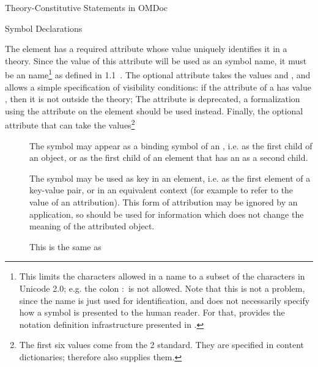 \begin{omgroup}[short=Mathematical Statements,id=statements]
\begin{omgroup}[id=constitutive-statements]{Theory-Constitutive Statements in OMDoc}
\begin{module}[id=constitutive-statements]
\begin{omgroup}[id=symbol-dec]{Symbol Declarations}
\begin{definition}[id=symbol.def]
  The {} element has a required attribute {} whose
  value uniquely identifies it in a theory.  Since the value of this attribute will be
  used as an {\openmath} symbol name, it must be an {\xml} name\footnote{This limits the
    characters allowed in a name to a subset of the characters in Unicode 2.0; e.g. the
    colon $\colon$ is not allowed. Note that this is not a problem, since the name is just
    used for identification, and does not necessarily specify how a symbol is presented to
    the human reader. For that, {\omdoc} provides the notation definition infrastructure
    presented in {}.} as defined in {\xml} 1.1~\cite{xml1.1:04}. The optional
  attribute {} takes the values {}
  and {}, and allows a simple specification of visibility
  conditions: if the {} attribute of a {} has
  value {}, then it is not 
  outside the theory; The {} attribute is deprecated, a
  formalization using the {} attribute on the
  {} element should be used instead.  Finally, the optional attribute
  {} that can take the values\footnote{The first six values come
    from the {\openmath}2 standard. They are specified in content dictionaries; therefore
    {\omdoc} also supplies them.}
\begin{description}
\item[{}] The symbol may appear as a binding symbol of an
  {}, i.e. as the first child of an {}
  object, or as the first child of an {} element that has an
  {} as a second child.
\item[{}] The symbol may be used as key in an
  {\openmath} {} element, i.e. as the first element of a
  key-value pair, or in an equivalent context (for example to refer to the value of an
  attribution).  This form of attribution may be ignored by an application, so should be
  used for information which does not change the meaning of the attributed {\openmath}
  object.
\item[{}] This is the same as

\end{description}
\end{definition}
\end{omgroup}
\end{module}
\end{omgroup}
\end{omgroup}
